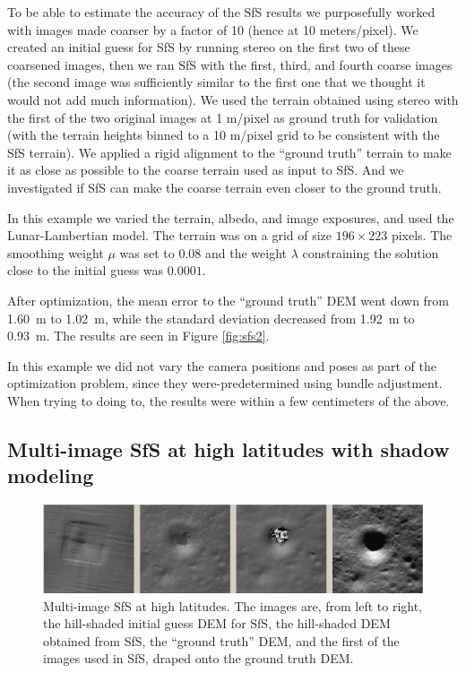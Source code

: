 \documentclass[12pt,oneside]{article}
\begin{document}
To be able to estimate the accuracy of the SfS results we purposefully
worked with images made coarser by a factor of 10 (hence at 10
meters/pixel). We created an initial guess for SfS by running stereo on
the first two of these coarsened images, then we ran SfS with the first,
third, and fourth coarse images (the second image was sufficiently
similar to the first one that we thought it would not add much
information). We used the terrain obtained using stereo with the first
of the two original images at 1 m/pixel as ground truth for
validation (with the terrain heights binned to a 10 m/pixel grid to be
consistent with the SfS terrain). We applied a rigid alignment to the
``ground truth'' terrain to make it as close as possible to the coarse
terrain used as input to SfS.  And we investigated if SfS can make the
coarse terrain even closer to the ground truth.

In this example we varied the terrain, albedo, and image exposures, and
used the Lunar-Lambertian model.  The terrain was on a grid of size
$196\times 223$ pixels. The smoothing weight $\mu$ was set to 0.08 and
the weight $\lambda$ constraining the solution close to the initial
guess was $0.0001$.

After optimization, the mean error to the ``ground truth'' DEM went
down from 1.60~m to 1.02~m, while the standard deviation
decreased from 1.92~m to 0.93~m. The results are seen in Figure \ref{fig:sfs2}.

In this example we did not vary the camera positions and poses as part
of the optimization problem, since they were-predetermined using bundle adjustment. When trying
to doing to, the results were within a few centimeters of the above. 

\subsection{Multi-image SfS at high latitudes with shadow modeling}

\begin{figure}[h!]
\begin{center}
\includegraphics[width=6in]{figures/sfs3.jpg}
\caption[sfs]{Multi-image SfS at high latitudes. The images are, from
  left to right, the hill-shaded initial guess DEM for SfS, the hill-shaded DEM obtained
from SfS, the ``ground truth'' DEM, and the first of the
images used in SfS, draped onto the ground truth DEM.}
\label{fig:sfs3}
\end{center}
\end{figure}
\end{document}
